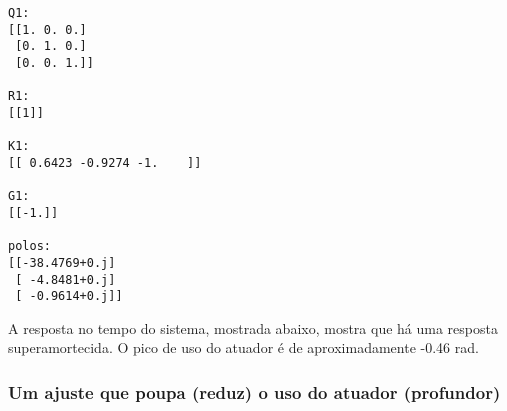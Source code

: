 \documentclass[13pt]{article}
\begin{document}
    \begin{Verbatim}[commandchars=\\\{\}]
Q1:
[[1. 0. 0.]
 [0. 1. 0.]
 [0. 0. 1.]]

R1:
[[1]]

K1:
[[ 0.6423 -0.9274 -1.    ]]

G1:
[[-1.]]

polos:
[[-38.4769+0.j]
 [ -4.8481+0.j]
 [ -0.9614+0.j]]
    \end{Verbatim}

    A resposta no tempo do sistema, mostrada abaixo, mostra que há uma
resposta superamortecida. O pico de uso do atuador é de aproximadamente
-0.46 rad.

    \begin{figure}[H]
    \centering    
        
    \end{figure}

    \hypertarget{um-ajuste-que-poupa-reduz-o-uso-do-atuador-profundor}{%
\subsubsection{Um ajuste que poupa (reduz) o uso do atuador
(profundor)}\label{um-ajuste-que-poupa-reduz-o-uso-do-atuador-profundor}}
\end{document}

